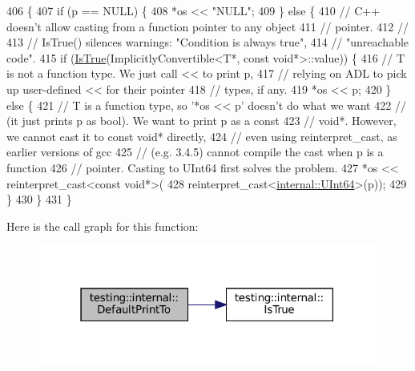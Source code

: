 \begin{DoxyCode}
406                                           \{
407   \textcolor{keywordflow}{if} (p == NULL) \{
408     *os << \textcolor{stringliteral}{"NULL"};
409   \} \textcolor{keywordflow}{else} \{
410     \textcolor{comment}{// C++ doesn't allow casting from a function pointer to any object}
411     \textcolor{comment}{// pointer.}
412     \textcolor{comment}{//}
413     \textcolor{comment}{// IsTrue() silences warnings: "Condition is always true",}
414     \textcolor{comment}{// "unreachable code".}
415     \textcolor{keywordflow}{if} (\hyperlink{namespacetesting_1_1internal_a527b9bcc13669b9a16400c8514266254}{IsTrue}(ImplicitlyConvertible<T*, const void*>::value)) \{
416       \textcolor{comment}{// T is not a function type.  We just call << to print p,}
417       \textcolor{comment}{// relying on ADL to pick up user-defined << for their pointer}
418       \textcolor{comment}{// types, if any.}
419       *os << p;
420     \} \textcolor{keywordflow}{else} \{
421       \textcolor{comment}{// T is a function type, so '*os << p' doesn't do what we want}
422       \textcolor{comment}{// (it just prints p as bool).  We want to print p as a const}
423       \textcolor{comment}{// void*.  However, we cannot cast it to const void* directly,}
424       \textcolor{comment}{// even using reinterpret\_cast, as earlier versions of gcc}
425       \textcolor{comment}{// (e.g. 3.4.5) cannot compile the cast when p is a function}
426       \textcolor{comment}{// pointer.  Casting to UInt64 first solves the problem.}
427       *os << reinterpret\_cast<const void*>(
428           \textcolor{keyword}{reinterpret\_cast<}\hyperlink{namespacetesting_1_1internal_aa6a1ac454e6d7e550fa4925c62c35caa}{internal::UInt64}\textcolor{keyword}{>}(p));
429     \}
430   \}
431 \}
\end{DoxyCode}
Here is the call graph for this function\+:
\nopagebreak
\begin{figure}[H]
\begin{center}
\leavevmode
\includegraphics[width=316pt]{namespacetesting_1_1internal_affa1f94e3ba8db8b964553c2871bf339_cgraph}
\end{center}
\end{figure}
\mbox{\label{namespacetesting_1_1internal_a78e4937ba564f01dac2ff25f3eece0ec}} 
